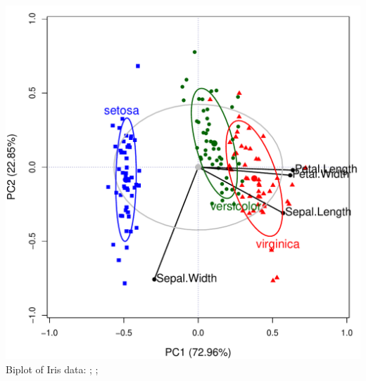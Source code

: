 \begin{frame}
\begin{center}
  \includegraphics[height=.9\textheight,clip]{figures/biplot-iris}
  \\ Biplot of Iris data: ; ;
\end{center}

\end{frame}
